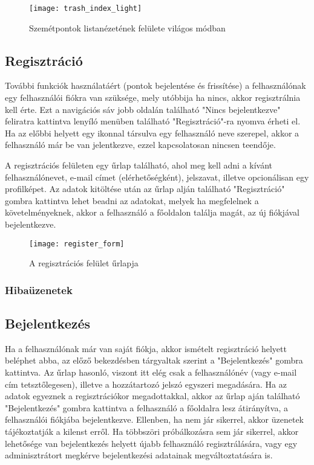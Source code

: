 \begin{figure}[H]
	\centering
	\texttt{[image: trash\_index\_light]}
	\caption{Szemétpontok listanézetének felülete világos módban}
	\label{fig:trash_index_light}
\end{figure}

\subsection{Regisztráció}

További funkciók használatáért (pontok bejelentése és frissítése) a felhasználónak egy felhasználói fiókra van szüksége, mely utóbbija ha nincs, akkor regisztrálnia kell érte. Ezt a navigációs sáv jobb oldalán található "Nincs bejelentkezve" feliratra kattintva lenyíló menüben található "Regisztráció"-ra nyomva érheti el. Ha az előbbi helyett egy  ikonnal társulva egy felhasználó neve szerepel, akkor a felhasználó már be van jelentkezve, ezzel kapcsolatosan nincsen teendője.\par
A regisztrációs felületen egy űrlap található, ahol meg kell adni a kívánt felhasználónevet, e-mail címet (elérhetőségként), jelszavat, illetve opcionálisan egy profilképet. Az adatok kitöltése után az űrlap alján található "Regisztráció" gombra kattintva lehet beadni az adatokat, melyek ha megfelelnek a követelményeknek, akkor a felhasználó a főoldalon találja magát, az új fiókjával bejelentkezve.

\begin{figure}[H]
	\centering
	\texttt{[image: register\_form]}
	\caption{A regisztrációs felület űrlapja}
	\label{fig:register_form}
\end{figure}

\subsubsection{Hibaüzenetek}

\subsection{Bejelentkezés}

Ha a felhasználónak már van saját fiókja, akkor ismételt regisztráció helyett beléphet abba, az előző bekezdésben tárgyaltak szerint a "Bejelentkezés" gombra kattintva. Az űrlap hasonló, viszont itt elég csak a felhasználónév (vagy e-mail cím tetsztőlegesen), illetve a hozzátartozó jelszó egyszeri megadására. Ha az adatok egyeznek a regisztrációkor megadottakkal, akkor az űrlap aján található "Bejelentkezés" gombra kattintva a felhasználó a főoldalra lesz átirányítva, a felhasználói fiókjába bejelentkezve. Ellenben, ha nem jár sikerrel, akkor üzenetek tájékoztatják a kilenst erről. Ha többszöri próbálkozásra sem jár sikerrel, akkor lehetősége van bejelentkezés helyett újabb felhasználó regisztrálására, vagy egy adminisztrátort megkérve bejelentkezési adatainak megváltoztatására is.

